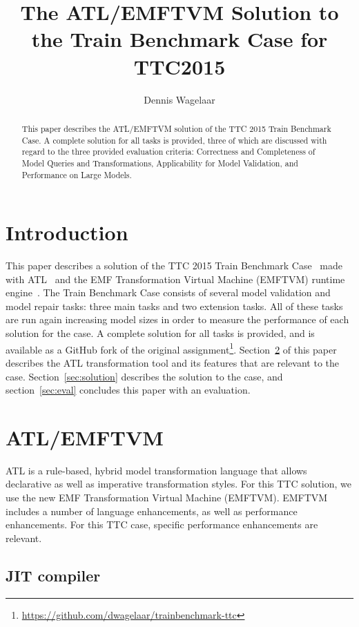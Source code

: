 \documentclass[submission,copyright,creativecommons]{eptcs}
\title{The {ATL/EMFTVM} Solution to the Train Benchmark Case for {TTC2015}}
\author{Dennis Wagelaar
\institute{HealthConnect\\
Vilvoorde, Belgium}
\email{dennis.wagelaar@healthconnect.be}
}
\begin{document}
\maketitle

\begin{abstract}
This paper describes the ATL/EMFTVM solution of the TTC 2015 Train Benchmark Case. A complete solution for all tasks is provided, three of which are discussed with regard to the three provided evaluation criteria: Correctness and Completeness of Model Queries and Transformations, Applicability for Model Validation, and Performance on Large Models.
\end{abstract}

\section{Introduction}
\label{sec:intro}

This paper describes a solution of the TTC 2015 Train Benchmark Case~\cite{conf/ttc/Szarnyas2015} made with ATL~\cite{journal/scp/Jouault2008} and the EMF Transformation Virtual Machine (EMFTVM) runtime engine~\cite{conf/models/Wagelaar2011}. The Train Benchmark Case consists of several model validation and model repair tasks: three main tasks and two extension tasks. All of these tasks are run again increasing model sizes in order to measure the performance of each solution for the case. A complete solution for all tasks is provided, and is available as a GitHub fork of the original assignment\footnote{\url{https://github.com/dwagelaar/trainbenchmark-ttc}}. Section~\ref{sec:atl} of this paper describes the ATL transformation tool and its features that are relevant to the case. Section~\ref{sec:solution} describes the solution to the case, and section~\ref{sec:eval} concludes this paper with an evaluation.

\section{ATL/EMFTVM}
\label{sec:atl} 

ATL is a rule-based, hybrid model transformation language that allows declarative as well as imperative transformation styles. For this TTC solution, we use the new EMF Transformation Virtual Machine (EMFTVM). EMFTVM includes a number of language enhancements, as well as performance enhancements. For this TTC case, specific performance enhancements are relevant.

\subsection{JIT compiler}
\end{document}
